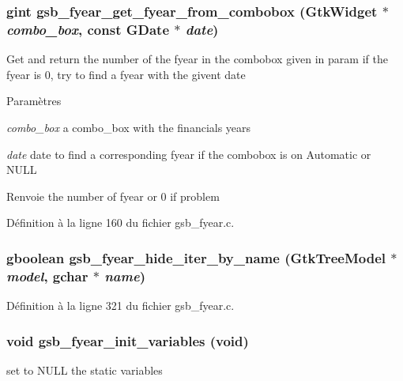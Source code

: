 \subsubsection[{gsb\_\-fyear\_\-get\_\-fyear\_\-from\_\-combobox}]{\setlength{\rightskip}{0pt plus 5cm}gint gsb\_\-fyear\_\-get\_\-fyear\_\-from\_\-combobox (GtkWidget $\ast$ {\em combo\_\-box}, \/  const GDate $\ast$ {\em date})}\label{gsb__fyear_8h_a587c6044305c503412e85ce68c61d18f}
Get and return the number of the fyear in the combobox given in param if the fyear is 0, try to find a fyear with the givent date


\begin{DoxyParams}{Paramètres}
\item[{\em combo\_\-box}]a combo\_\-box with the financials years \item[{\em date}]date to find a corresponding fyear if the combobox is on Automatic or NULL\end{DoxyParams}
\begin{DoxyReturn}{Renvoie}
the number of fyear or 0 if problem 
\end{DoxyReturn}


Définition à la ligne 160 du fichier gsb\_\-fyear.c.

\subsubsection[{gsb\_\-fyear\_\-hide\_\-iter\_\-by\_\-name}]{\setlength{\rightskip}{0pt plus 5cm}gboolean gsb\_\-fyear\_\-hide\_\-iter\_\-by\_\-name (GtkTreeModel $\ast$ {\em model}, \/  gchar $\ast$ {\em name})}\label{gsb__fyear_8h_a860e2fbddb31ed8ddb8d70a4d90e7c37}


Définition à la ligne 321 du fichier gsb\_\-fyear.c.

\subsubsection[{gsb\_\-fyear\_\-init\_\-variables}]{\setlength{\rightskip}{0pt plus 5cm}void gsb\_\-fyear\_\-init\_\-variables (void)}\label{gsb__fyear_8h_ac8924e7fc78d895c0611fdaa4580a6f2}
set to NULL the static variables


